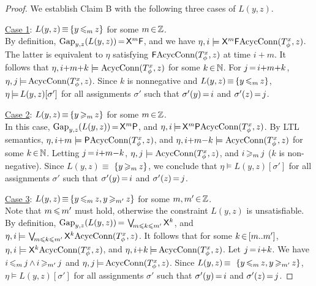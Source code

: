 \begin{proof}
We establish Claim B with the following three cases of $L(y,z)$.

\underline{Case 1}: $L(y,z)\,{\equiv}\,\{y\,{\leqslant_{m}}\, z\}$
for some $m\,{\in}\,\mathbb{Z}$.
\\
By definition,
$\text{Gap}_{y,z}(L(y,z))\,{=}\,{\sf X}^m{\sf F}$, and
we have $\eta,i\models {\sf X}^m{\sf F}\text{AcycConn}(T_\phi^x,z)$.
The latter is equivalent to $\eta$ satisfying ${\sf F}\text{AcycConn}(T_\phi^x,z)$
at time $i{+}m$.
It follows that
$\eta,i{+}m{+}k\models \text{AcycConn}(T_\phi^x,z)$
for some $k\,{\in}\,\mathbb{N}$.
For $j\,{=}\,i{+}m{+}k$,
$\eta,j\,{\models}\, \text{AcycConn}(T_\phi^x,z)$.
Since $k$ is nonnegative
and $L(y,z)\,{\equiv}\,\{y\,{\leqslant_{m}}\, z\}$,
$\eta\,{\models}\, L(y,z)[\sigma']$
for all assignments $\sigma'$
such that $\sigma'(y)\,{=}\,i$ and $\sigma'(z)\,{=}\,j$.

\underline{Case 2}: $L(y,z)\,{\equiv}\,\{y \,{\geqslant_{m}}\, z\}$
for some $m\,{\in}\,\mathbb{Z}$.
\\
In this case, $\text{Gap}_{y,z}(L(y,z))\,{=}\,{\sf X}^{m}{\sf P}$, and
$\eta,i\,{\models}\, {\sf X}^{m}{\sf P}\text{AcycConn}(T_\phi^x,z)$.
By LTL semantics,
$\eta,i{+}m\models {\sf P}\text{AcycConn}(T_\phi^x,z)$,
and
$\eta,i{+}m{-}k\models \text{AcycConn}(T_\phi^x,z)$
for some $k\,{\in}\,\mathbb{N}$.
Letting $j\,{=}\,i{+}m{-}k$,
$\eta,j\models \text{AcycConn}(T_\phi^x,z)$,
and $i\,{\geqslant_{m}}\,j$ ($k$ is non-negative).
Since $L(y,z)\equiv$ $\{y\,{\geqslant_m}\, z\}$,
we conclude that 
$\eta\models L(y,z)[\sigma']$
for all assignments $\sigma'$
such that $\sigma'(y)\,{=}\,i$ and $\sigma'(z)\,{=}\,j$.

\underline{Case 3}:
$L(y,z)\,{\equiv}\,\{y\,{\leqslant_{m}}\, z,y\,{\geqslant_{m'}}\,z\}$
for some $m,m'\,{\in}\,\mathbb{Z}$.
\\
Note that $m\,{\leqslant}\, m'$ must hold,
otherwise the constraint $L(y,z)$ is unsatisfiable.
By definition,
$\text{Gap}_{y,z}(L(y,z))\,{=}\,\bigvee_{\hspace*{-2pt}m\leqslant k\leqslant m'} {\sf X}^k$, and
$\eta,i\,{\models}\,\bigvee_{\hspace*{-2pt}m\leqslant k\leqslant m'}{\sf X}^k
\text{AcycConn}(T_\phi^x,z)$.
It follows that
for some $k\,{\in}\,[m..m']$,
$\eta,i\models {\sf X}^k\text{AcycConn}(T_\phi^x,z)$,
and 
$\eta,i{+}k\,{\models}\, \text{AcycConn}(T_\phi^x,z)$.
Let $j\,{=}\,i{+}k$.
We have
$i\,{\leqslant_m}\,j\,{\wedge}\, i\,{\geqslant_{m'}}\,j$ and
$\eta,j\,{\models}\, \text{AcycConn}(T_\phi^x,z)$.
Since
$L(y,z)\,{\equiv}\,$ $\{y\,{\leqslant_m}\, z,y\,{\geqslant_{m'}}\, z\}$,
$\eta\models L(y,z)[\sigma']$
for all assignments $\sigma'$ such that
$\sigma'(y)\,{=}\,i$ and $\sigma'(z)\,{=}\,j$.


\end{proof}
